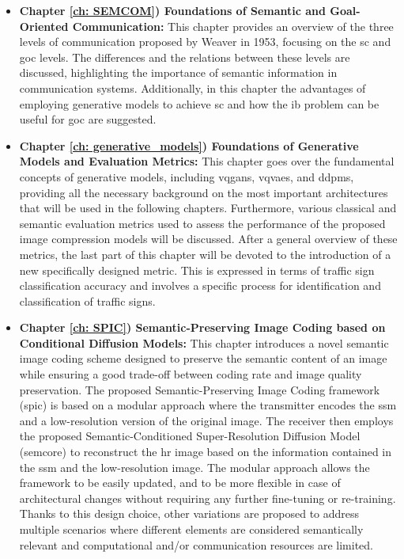 \begin{itemize}[label={}]
    \item {\textbf{Chapter \ref{ch: SEMCOM}) Foundations of Semantic and Goal-Oriented Communication:}} This chapter provides an overview of the three levels of communication proposed by Weaver in 1953, focusing on the \gls{sc} and \gls{goc} levels. The differences and the relations between these levels are discussed, highlighting the importance of semantic information in communication systems. Additionally, in this chapter the advantages of employing generative models to achieve \gls{sc} and how the \gls{ib} problem can be useful for \gls{goc} are suggested.
    \item {\textbf{Chapter \ref{ch: generative_models}) Foundations of Generative Models and Evaluation Metrics:}} This chapter goes over the fundamental concepts of generative models, including \glspl{vqgan}, \glspl{vqvae}, and \glspl{ddpm}, providing all the necessary background on the most important architectures that will be used in the following chapters. Furthermore, various classical and semantic evaluation metrics used to assess the performance of the proposed image compression models will be discussed. After a general overview of these metrics, the last part of this chapter will be devoted to the introduction of a new specifically designed metric. This is expressed in terms of traffic sign classification accuracy and involves a specific process for identification and classification of traffic signs.
    \item {\textbf{Chapter \ref{ch: SPIC}) Semantic-Preserving Image Coding based on Conditional Diffusion Models:}} This chapter introduces a novel semantic image coding scheme designed to preserve the semantic content of an image  while ensuring a good trade-off between coding rate and image quality preservation. The proposed Semantic-Preserving Image Coding framework (\acrshort{spic}) is based on a modular approach where the transmitter encodes the \gls{ssm} and a low-resolution version of the original image. The receiver then employs the proposed Semantic-Conditioned Super-Resolution Diffusion Model (\acrshort{semcore}) to reconstruct the \gls{hr} image based on the information contained in the \gls{ssm} and the low-resolution image. 
    The modular approach allows the framework to be easily updated, and to be more flexible in case of architectural changes without requiring any further fine-tuning or re-training. Thanks to this design choice, other variations are proposed to address multiple scenarios where different elements are considered semantically relevant and computational and/or communication resources are limited.

\end{itemize}
